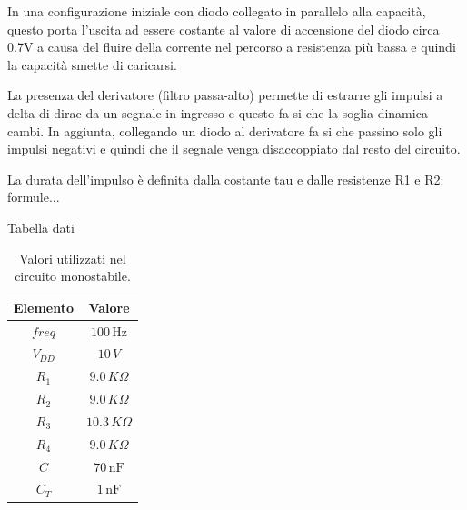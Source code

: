 \documentclass[a4paper,12pt]{article}
\begin{document}
In una configurazione iniziale con diodo collegato in parallelo alla capacità, questo porta l'uscita ad essere costante al valore di accensione del diodo circa 0.7V a causa del fluire della corrente nel percorso a resistenza più bassa e quindi la capacità smette di caricarsi.

La presenza del derivatore (filtro passa-alto) permette di estrarre gli impulsi a delta di dirac da un segnale in ingresso e questo fa si che la soglia dinamica cambi.
In aggiunta, collegando un diodo al derivatore fa si che passino solo gli impulsi negativi e quindi che il segnale venga disaccoppiato dal resto del circuito.

La durata dell'impulso è definita dalla costante tau e dalle resistenze R1 e R2:
formule...

Tabella dati
\begin{table}[h]
	\centering
	\setlength{\tabcolsep}{20pt}
	\begin{tabular}{c c}
		\toprule
		Elemento & Valore             \\
		\midrule
		$freq$   & $100\,\mathrm{Hz}$ \\
		$V_{DD}$ & $10\,V$            \\
		$R_1$    & $9.0\,K\Omega$     \\
		$R_2$    & $9.0\,K\Omega$     \\
		$R_3$    & $10.3\,K\Omega$    \\
		$R_4$    & $9.0\,K\Omega$     \\
		$C$      & $70\,\mathrm{nF}$  \\
		$C_T$    & $1\,\mathrm{nF}$   \\
		\bottomrule
	\end{tabular}
	\caption{Valori utilizzati nel circuito monostabile.}
	\label{tab:monostabile}
\end{table}
\end{document}
